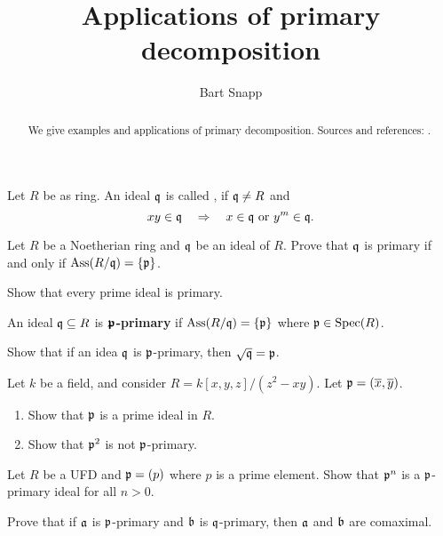 \documentclass{ximera}
\author{Bart Snapp}
\title{Applications of primary decomposition}
\begin{document}
\begin{abstract}
  We give examples and applications of primary decomposition. Sources
  and references: \cite{AM1969,sD2008,dE1995}.
\end{abstract}
\maketitle



\begin{definition}
  Let $R$ be as ring. An ideal $\mathfrak{q}$ is called , if $\mathfrak{q}\ne
  R$ and
  \[
  xy\in\mathfrak{q} \quad \Rightarrow \quad x\in\mathfrak{q}\text{ or }y^m\in\mathfrak{q}.
  \]
\end{definition}

\begin{exercise}
  Let $R$ be a Noetherian ring and $\mathfrak{q}$ be an ideal of $R$. Prove that
  $\mathfrak{q}$ is primary if and only if $\operatorname{Ass}(R/\mathfrak{q}) = \{\mathfrak{p}\}$.
\end{exercise}

\begin{exercise}
  Show that every prime ideal is primary.
\end{exercise}

\begin{definition}
  An ideal $\mathfrak{q}\subseteq R$ is \textbf{$\boldsymbol{\mathfrak{p}}$-primary} if
  $\operatorname{Ass}(R/\mathfrak{q}) = \{\mathfrak{p}\}$ where $\mathfrak{p}\in\operatorname{Spec}(R)$.
\end{definition}


\begin{exercise}
  Show that if an idea $\mathfrak{q}$ is $\mathfrak{p}$-primary, then $\sqrt{\mathfrak{q}} = \mathfrak{p}$.
\end{exercise}

\begin{exercise}
  Let $k$ be a field, and consider $R=k[x,y,z]/(z^2-xy)$. Let $\mathfrak{p} = (\overline{x},\overline{y})$.
  \begin{enumerate}
  \item Show that $\mathfrak{p}$ is a prime ideal in $R$.
  \item Show that $\mathfrak{p}^2$ is not $\mathfrak{p}$-primary.
  \end{enumerate}
\end{exercise}

\begin{exercise}
  Let $R$ be a UFD and $\mathfrak{p} = (p)$ where $p$ is a prime element. Show
  that $\mathfrak{p}^n$ is a $\mathfrak{p}$-primary ideal for all $n>0$.
\end{exercise}

\begin{exercise}
  Prove that if $\mathfrak{a}$ is $\mathfrak{p}$-primary and $\mathfrak{b}$ is $\mathfrak{q}$-primary, then
  $\mathfrak{a}$ and $\mathfrak{b}$ are comaximal.
\end{exercise}
\end{document}
